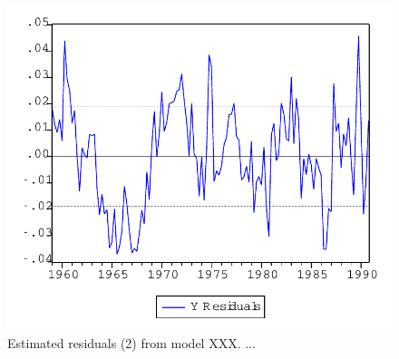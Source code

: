 \begin{figure}[ht]
    \begin{center}
        \includegraphics[scale=0.5,angle=0]{thesis/figures/graph.pdf}
        \caption{Estimated residuals (2) from model XXX. ...}
        \label{Fig:Resids2}
    \end{center}
\end{figure}
